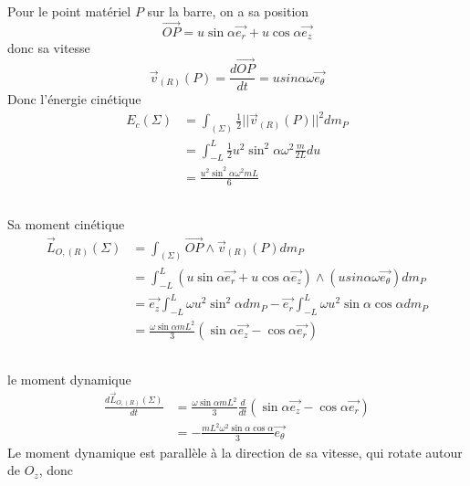 \documentclass[a4paper,12pt]{book}
\begin{document}
Pour le point matériel $P$ sur la barre, on a sa position
$$
\overrightarrow{OP}=u\sin\alpha \vec{e_r}+u\cos\alpha\vec{e_z}
$$
donc sa vitesse
$$
\overrightarrow{v}_{(R)}(P)=\frac{d\overrightarrow{OP}}{dt}=usin\alpha \omega \vec{e_\theta}
$$
Donc l'énergie cinétique
\begin{align*}
    E_c(\Sigma)&=\int_{(\Sigma)}\frac{1}{2}||\overrightarrow{v}_{(R)}(P)||^2dm_P\\
    &=\int^L_{-L}\frac{1}{2}u^2\sin^2\alpha\omega^2\frac{m}{2L}du\\
    &=\boxed{\frac{u^2\sin^2\alpha\omega^2mL}{6}}
\end{align*}
\subsection{}
Sa moment cinétique
\begin{align*}
\vec{L}_{O,(R)}(\Sigma)&=\int_{(\Sigma)}\overrightarrow{OP}\wedge\vec{v}_{(R)}(P)dm_P\\
&=\int^L_{-L}(u\sin\alpha \vec{e_r}+u\cos\alpha\vec{e_z})\wedge(usin\alpha \omega \vec{e_\theta})dm_P\\
&=\vec{e_z}\int^L_{-L}\omega u^2\sin^2\alpha dm_P-\vec{e_r}\int^L_{-L}\omega u^2\sin\alpha\cos\alpha dm_P\\
&=\boxed{\frac{\omega\sin\alpha mL^2}{3}(\sin\alpha\vec{e_z}-\cos\alpha\vec{e_r})}
\end{align*}
\subsection{}
le moment dynamique
\begin{align*}
\frac{d\vec{L}_{O,(R)}(\Sigma)}{dt}&=\frac{\omega\sin\alpha mL^2}{3}\frac{d}{dt}(\sin\alpha\vec{e_z}-\cos\alpha\vec{e_r})\\
&=\boxed{-\frac{mL^2\omega^2\sin\alpha\cos\alpha}{3}\vec{e_\theta}}
\end{align*}
Le moment dynamique est parallèle à la direction de sa vitesse, qui rotate autour de $O_z$, 
donc 

\end{document}
